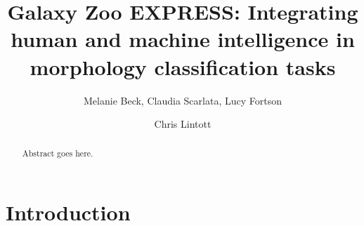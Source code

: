 \documentclass[twocolumn]{aastex6}
\begin{document}
\title{Galaxy Zoo EXPRESS: Integrating human and machine intelligence in morphology classification tasks}


\author{Melanie Beck, Claudia Scarlata, Lucy Fortson}%

\author{Chris Lintott}



\begin{abstract}

Abstract goes here.

\end{abstract}



\section{Introduction} \label{sec:intro}
\end{document}
